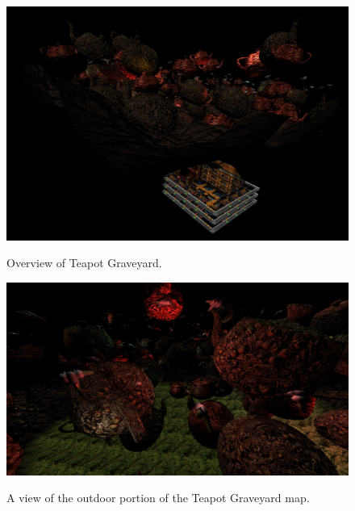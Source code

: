 \documentclass[12pt]{ucthesis}
\newcommand{\captionfonts}{\small\bf\ssp}
\begin{document}
\begin{figure}
\begin{center}
\includegraphics[width=\textwidth]{Images/GraveyardOverview.jpg}
\captionfonts
\caption[Teapot Graveyard Overview]{Overview of Teapot Graveyard.}
\label{fig:fraveyard-overview}

\includegraphics[width=\textwidth]{Images/TeapotGraveyard.jpg}
\captionfonts
\caption[Teapot Graveyard]{A view of the outdoor portion of the Teapot Graveyard map.}
\label{fig:teapot-graveyard}
\end{center}
\end{figure}
\end{document}
